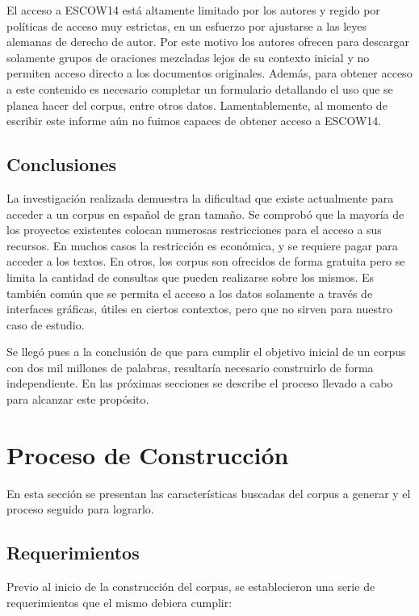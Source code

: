 El acceso a ESCOW14 está altamente limitado por los autores y regido por políticas de acceso muy
estrictas, en un esfuerzo por ajustarse a las leyes alemanas de derecho de autor. Por este motivo
los autores ofrecen para descargar solamente grupos de oraciones mezcladas lejos de su contexto inicial
y no permiten acceso directo a los documentos originales. Además, para obtener acceso a este contenido
es necesario completar un formulario detallando el uso que se planea hacer del corpus, entre otros
datos. Lamentablemente, al momento de escribir este informe aún no fuimos capaces de obtener acceso
a ESCOW14.

\subsection{Conclusiones}

La investigación realizada demuestra la dificultad que existe actualmente para acceder a un corpus en
español de gran tamaño. Se comprobó que la mayoría de los proyectos existentes colocan
numerosas restricciones para el acceso a sus recursos. En muchos casos la restricción es económica,
y se requiere pagar para acceder a los textos. En otros, los corpus son ofrecidos de forma gratuita pero
se limita la cantidad de consultas que pueden realizarse sobre los mismos. Es también común que se
permita el acceso a los datos solamente a través de interfaces gráficas, útiles en ciertos contextos, pero
que no sirven para nuestro caso de estudio.

Se llegó pues a la conclusión de que para cumplir el objetivo inicial de un corpus con dos mil millones
de palabras, resultaría necesario construirlo de forma independiente. En las próximas secciones se describe
el proceso llevado a cabo para alcanzar este propósito.

\section{Proceso de Construcción}

En esta sección se presentan las características buscadas del corpus a generar y el proceso seguido
para lograrlo.

\subsection{Requerimientos}

Previo al inicio de la construcción del corpus, se establecieron una serie de requerimientos que el
mismo debiera cumplir:


